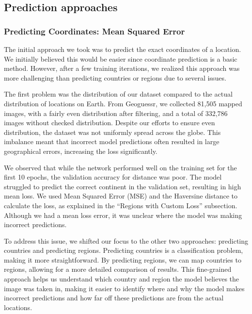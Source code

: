 \subsection{Prediction approaches}\label{prediction-approaches}

\subsubsection{Predicting Coordinates: Mean Squared
Error}\label{predicting-coordinates-mean-squared-error}

The initial approach we took was to predict the exact coordinates of a
location. We initially believed this would be easier since coordinate
prediction is a basic method. However, after a few training iterations,
we realized this approach was more challenging than predicting countries
or regions due to several issues.

The first problem was the distribution of our dataset compared to the
actual distribution of locations on Earth. From Geoguessr, we collected
81,505 mapped images, with a fairly even distribution after filtering,
and a total of 332,786 images without checked distribution. Despite our
efforts to ensure even distribution, the dataset was not uniformly
spread across the globe. This imbalance meant that incorrect model
predictions often resulted in large geographical errors, increasing the
loss significantly.

We observed that while the network performed well on the training set
for the first 10 epochs, the validation accuracy for distance was poor.
The model struggled to predict the correct continent in the validation
set, resulting in high mean loss. We used Mean Squared Error (MSE) and
the Haversine distance to calculate the loss, as explained in the
``Regions with Custom Loss'' subsection. Although we had a mean loss
error, it was unclear where the model was making incorrect predictions.

To address this issue, we shifted our focus to the other two approaches:
predicting countries and predicting regions. Predicting countries is a
classification problem, making it more straightforward. By predicting
regions, we can map countries to regions, allowing for a more detailed
comparison of results. This fine-grained approach helps us understand
which country and region the model believes the image was taken in,
making it easier to identify where and why the model makes incorrect
predictions and how far off these predictions are from the actual
locations.

